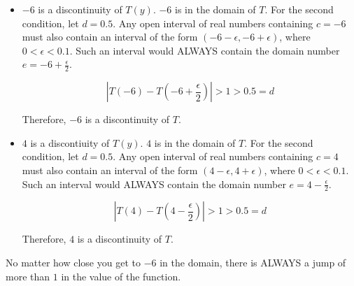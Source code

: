 \documentclass{ximera}
\begin{document}
\begin{example}
\begin{itemize}
\item $-6$ is a discontinuity of $T(y)$.  $-6$ is in the domain of $T$.  For the second condition, let $d = 0.5$. Any open interval of real numbers containing $c = -6$ must also contain an interval of the form $(-6-\epsilon, -6+\epsilon)$, where $0 < \epsilon < 0.1$.   Such an interval would ALWAYS contain the domain number $e = -6+\frac{\epsilon}{2}$.

\[ \left| T(-6) - T\left(-6+\frac{\epsilon}{2}\right) \right| > 1 > 0.5 = d \]

Therefore, $-6$ is a discontinuity of $T$. \\


\item $4$ is a discontiuity of $T(y)$.   $4$ is in the domain of $T$.  For the second condition, let $d = 0.5$. Any open interval of real numbers containing $c = 4$ must also contain an interval of the form $(4-\epsilon, 4+\epsilon)$, where $0 < \epsilon < 0.1$.   Such an interval would ALWAYS contain the domain number $e = 4-\frac{\epsilon}{2}$.

\[ \left| T(4) - T\left(4-\frac{\epsilon}{2}\right) \right| > 1 > 0.5 = d \]

Therefore, $4$ is a discontinuity of $T$. \\

\end{itemize}



\end{example}

No matter how close you get to $-6$ in the domain, there is ALWAYS a jump of more than $1$ in the value of the function.  \\
\end{document}
